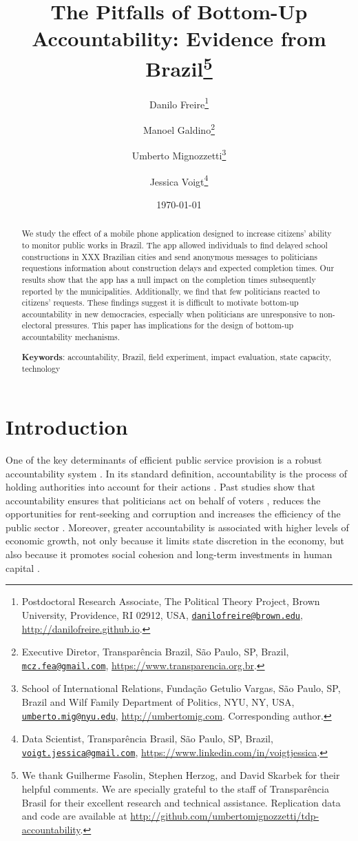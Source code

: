 \documentclass[12pt,a4paper,]{article}
\title{The Pitfalls of Bottom-Up Accountability: Evidence from Brazil\thanks{We thank Guilherme Fasolin, Stephen Herzog, and David Skarbek for their
helpful comments. We are specially grateful to the staff of
Transparência Brasil for their excellent research and technical
assistance. Replication data and code are available at
\url{http://github.com/umbertomignozzetti/tdp-accountability}.}}
\author{Danilo Freire\footnote{Postdoctoral Research Associate, The Political
  Theory Project, Brown University, Providence, RI 02912, USA,
  \href{mailto:danilofreire@brown.edu}{\nolinkurl{danilofreire@brown.edu}},
  \url{http://danilofreire.github.io}.} \and Manoel Galdino\footnote{Executive Diretor, Transparência Brazil, São
  Paulo, SP, Brazil,
  \href{mailto:mcz.fea@gmail.com}{\nolinkurl{mcz.fea@gmail.com}},
  \url{https://www.transparencia.org.br}.} \and Umberto Mignozzetti\footnote{School of International Relations, Fundação
  Getulio Vargas, São Paulo, SP, Brazil and Wilf Family Department of
  Politics, NYU, NY, USA,
  \href{mailto:umberto.mig@nyu.edu}{\nolinkurl{umberto.mig@nyu.edu}},
  \url{http://umbertomig.com}. Corresponding author.} \and Jessica Voigt\footnote{Data Scientist, Transparência Brasil, São Paulo,
  SP, Brazil,
  \href{mailto:voigt.jessica@gmail.com}{\nolinkurl{voigt.jessica@gmail.com}},
  \url{https://www.linkedin.com/in/voigtjessica}.}}
\date{\today}
\begin{document}
\maketitle

\begin{abstract}
\doublespacing \noindent We study the effect of a mobile phone application designed to increase
citizens' ability to monitor public works in Brazil. The app allowed
individuals to find delayed school constructions in XXX Brazilian cities
and send anonymous messages to politicians requestions information about
construction delays and expected completion times. Our results show that
the app has a null impact on the completion times subsequently reported
by the municipalities. Additionally, we find that few politicians
reacted to citizens' requests. These findings suggest it is difficult to
motivate bottom-up accountability in new democracies, especially when
politicians are unresponsive to non-electoral pressures. This paper has
implications for the design of bottom-up accountability mechanisms.
\vspace{.25cm}

\noindent \textbf{Keywords}: accountability, Brazil, field experiment, impact evaluation, state
capacity, technology
\vspace{.25cm}

\end{abstract}


\newpage

\hypertarget{introduction}{%
\section{\texorpdfstring{Introduction\label{sec:intro}}{Introduction}}\label{introduction}}

One of the key determinants of efficient public service provision is a
robust accountability system
\citep{besley2003incentives,cameron2004public,o1998horizontal}. In its
standard definition, accountability is the process of holding
authorities into account for their actions
\citep{finer1941administrative,mulgan2000accountability,o1990bureaucratic}.
Past studies show that accountability ensures that politicians act on
behalf of voters \citep{freire2010ngp, moncrieffe1998reconceptualizing},
reduces the opportunities for rent-seeking and corruption
\citep{deininger2005does,wenar2006accountability} and increases the
efficiency of the public sector \citep{adsera2003you,bjorkman2009power}.
Moreover, greater accountability is associated with higher levels of
economic growth, not only because it limits state discretion in the
economy, but also because it promotes social cohesion and long-term
investments in human capital
\citep{benhabib2010economic, cox2018executive, suebvises2018social,ponzetto2018social}.
\end{document}
